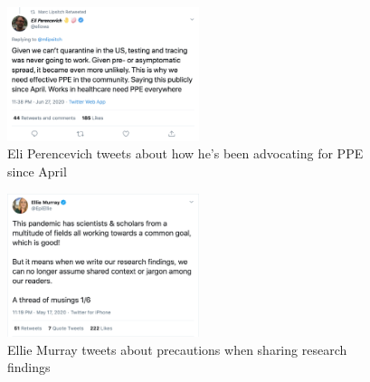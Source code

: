\documentclass[acmsmall,authordraft]{acmart}
\begin{document}
\begin{figure}
  \includegraphics[width=0.5\textwidth]{Pictures/Appendix_Tweets/eli perencevich tweet.png}
  \caption{Eli Perencevich tweets about how he's been advocating for PPE since April}
  \label{eli_perencevich_tweet}
\end{figure}

\begin{figure}
  \includegraphics[width=0.5\textwidth]{Pictures/Appendix_Tweets/ellie murray tweet.png}
  \caption{Ellie Murray tweets about precautions when sharing research findings}
  \label{ellie_murray_tweet}
\end{figure}
\end{document}
